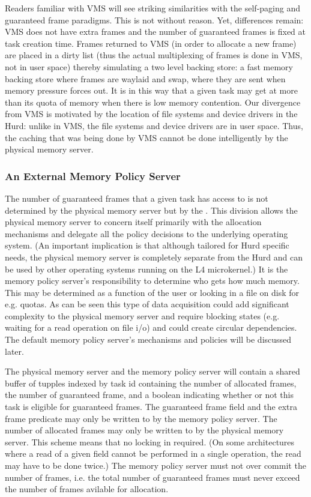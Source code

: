 Readers familiar with VMS will see striking similarities with the
self-paging and guaranteed frame paradigms.  This is not without
reason.  Yet, differences remain: VMS does not have extra frames and
the number of guaranteed frames is fixed at task creation time.  Frames
returned to VMS (in order to allocate a new frame) are placed in a
dirty list (thus the actual multiplexing of frames is done in VMS, not
in user space) thereby simulating a two level backing store: a fast
memory backing store where frames are waylaid and swap, where they are
sent when memory pressure forces out.  It is in this way that a given
task may get at more than its quota of memory when there is low memory
contention.  Our divergence from VMS is motivated by the location of
file systems and device drivers in the Hurd: unlike in VMS, the file
systems and device drivers are in user space.  Thus, the caching that
was being done by VMS cannot be done intelligently by the physical
memory server.

\subsubsection{An External Memory Policy Server}

The number of guaranteed frames that a given task has access to is not
determined by the physical memory server but by the .  This division allows the physical memory server to
concern itself primarily with the allocation mechanisms and delegate
all the policy decisions to the underlying operating system.  (An
important implication is that although tailored for Hurd specific
needs, the physical memory server is completely separate from the Hurd
and can be used by other operating systems running on the L4
microkernel.)  It is the memory policy server's responsibility to
determine who gets how much memory.  This may be determined as a
function of the user or looking in a file on disk for e.g. quotas.  As
can be seen this type of data acquisition could add significant
complexity to the physical memory server and require blocking states
(e.g. waiting for a read operation on file i/o) and could create
circular dependencies.  The default memory policy server's mechanisms
and policies will be discussed later.

The physical memory server and the memory policy server will contain a
shared buffer of tupples indexed by task id containing the number of
allocated frames, the number of guaranteed frame, and a boolean
indicating whether or not this task is eligible for guaranteed frames.
The guaranteed frame field and the extra frame predicate may only be
written to by the memory policy server.  The number of allocated frames
may only be written to by the physical memory server.  This scheme
means that no locking in required.  (On some architectures where a
read of a given field cannot be performed in a single operation, the
read may have to be done twice.)  The memory policy server must not
over commit the number of frames, i.e. the total number of guaranteed
frames must never exceed the number of frames avilable for allocation.

